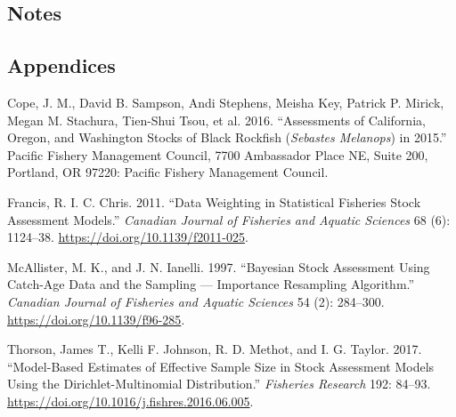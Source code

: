 \documentclass[
]{scrartcl}
\newlength{\cslhangindent}
\newenvironment{CSLReferences}[2] %
 {\begin{list}{}{%
  \setlength{\itemindent}{0pt}
  \setlength{\leftmargin}{0pt}
  \setlength{\parsep}{0pt}
  \ifodd #1
   \setlength{\leftmargin}{\cslhangindent}
   \setlength{\itemindent}{-1\cslhangindent}
  \fi
  \setlength{\itemsep}{#2\baselineskip}}}
 {\end{list}}
\begin{document}
\newpage{}

\subsection{Notes}\label{notes}

\newpage{}

\subsection*{Appendices}\label{sec-appendix}

\label{refs}
\begin{CSLReferences}{1}{0}
Cope, J. M., David B. Sampson, Andi Stephens, Meisha Key, Patrick P.
Mirick, Megan M. Stachura, Tien-Shui Tsou, et al. 2016. {``Assessments
of {California}, {Oregon}, and {Washington} Stocks of Black Rockfish
(\emph{{Sebastes} Melanops}) in 2015.''} Pacific Fishery Management
Council, 7700 Ambassador Place NE, Suite 200, Portland, OR 97220:
Pacific Fishery Management Council.

Francis, R. I. C. Chris. 2011. {``Data Weighting in Statistical
Fisheries Stock Assessment Models.''} \emph{Canadian Journal of
Fisheries and Aquatic Sciences} 68 (6): 1124--38.
\url{https://doi.org/10.1139/f2011-025}.

McAllister, M. K., and J. N. Ianelli. 1997. {``Bayesian Stock Assessment
Using Catch-Age Data and the Sampling --- Importance Resampling
Algorithm.''} \emph{Canadian Journal of Fisheries and Aquatic Sciences}
54 (2): 284--300. \url{https://doi.org/10.1139/f96-285}.

Thorson, James T., Kelli F. Johnson, R. D. Methot, and I. G. Taylor.
2017. {``Model-Based Estimates of Effective Sample Size in Stock
Assessment Models Using the {Dirichlet}-Multinomial Distribution.''}
\emph{Fisheries Research} 192: 84--93.
\url{https://doi.org/10.1016/j.fishres.2016.06.005}.

\end{CSLReferences}
\end{document}
